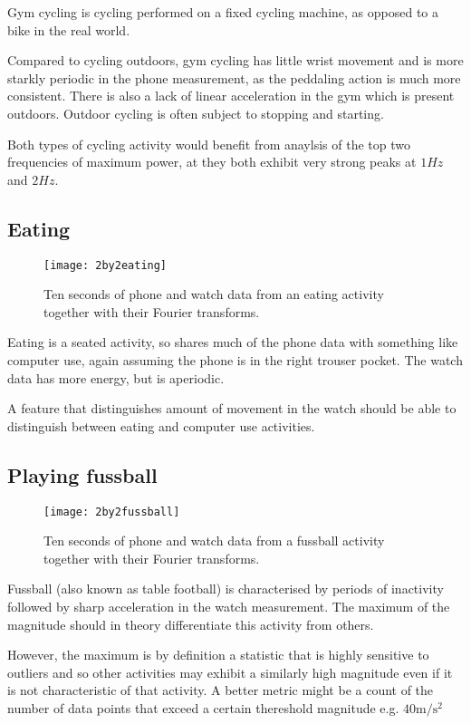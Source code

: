      Gym cycling is cycling performed on a fixed cycling machine, as opposed to a bike in the real world.
      
      Compared to cycling outdoors, gym cycling has little wrist movement and is more starkly periodic in the phone measurement, as the peddaling action is much more consistent. There is also a lack of linear acceleration in the gym which is present outdoors. Outdoor cycling is often subject to stopping and starting.
      
      Both types of cycling activity would benefit from anaylsis of the top two frequencies of maximum power, at they both exhibit very strong peaks at $1 \si{Hz}$ and $2 \si{Hz}$.
    \pagebreak[4]
    \subsection{Eating}
      \begin{figure}[!th]
        \centering
        \texttt{[image: 2by2eating]}
        \caption{Ten seconds of phone and watch data from an eating activity together with their Fourier transforms.}
        \label{fig:2by2eating}
      \end{figure}
      
      Eating is a seated activity, so shares much of the phone data with something like computer use, again assuming the phone is in the right trouser pocket. The watch data has more energy, but is aperiodic.
      
      A feature that distinguishes amount of movement in the watch should be able to distinguish between eating and computer use activities.
    \pagebreak[4]
    \subsection{Playing fussball}
      \begin{figure}[!th]
        \centering
        \texttt{[image: 2by2fussball]}
        \caption{Ten seconds of phone and watch data from a fussball activity together with their Fourier transforms.}
        \label{fig:2by2fussball}
      \end{figure}
      
      Fussball (also known as table football) is characterised by periods of inactivity followed by sharp acceleration in the watch measurement. The maximum of the magnitude should in theory differentiate this activity from others.
      
      However, the maximum is by definition a statistic that is highly sensitive to outliers and so other activities may exhibit a similarly high magnitude even if it is not characteristic of that activity. A better metric might be a count of the number of data points that exceed a certain thereshold magnitude e.g. $40 \si{\metre\per\square\second}$ 
    \pagebreak[4]
